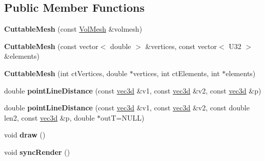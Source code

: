 \subsection*{Public Member Functions}
\begin{DoxyCompactItemize}
\item 
\hypertarget{classps_1_1elastic_1_1CuttableMesh_a1050ce8dfd09564ecd252c386d4c7743}{}{\bfseries Cuttable\+Mesh} (const \hyperlink{classps_1_1elastic_1_1VolMesh}{Vol\+Mesh} \&volmesh)\label{classps_1_1elastic_1_1CuttableMesh_a1050ce8dfd09564ecd252c386d4c7743}

\item 
\hypertarget{classps_1_1elastic_1_1CuttableMesh_a1245acf5e570ead2e0835594721d4adc}{}{\bfseries Cuttable\+Mesh} (const vector$<$ double $>$ \&vertices, const vector$<$ U32 $>$ \&elements)\label{classps_1_1elastic_1_1CuttableMesh_a1245acf5e570ead2e0835594721d4adc}

\item 
\hypertarget{classps_1_1elastic_1_1CuttableMesh_a8e01b70f0d11e393059dbda36645b755}{}{\bfseries Cuttable\+Mesh} (int ct\+Vertices, double $\ast$vertices, int ct\+Elements, int $\ast$elements)\label{classps_1_1elastic_1_1CuttableMesh_a8e01b70f0d11e393059dbda36645b755}

\item 
\hypertarget{classps_1_1elastic_1_1CuttableMesh_a933970175879dd15ac7e245e2c60a828}{}double {\bfseries point\+Line\+Distance} (const \hyperlink{classps_1_1base_1_1Vec3}{vec3d} \&v1, const \hyperlink{classps_1_1base_1_1Vec3}{vec3d} \&v2, const \hyperlink{classps_1_1base_1_1Vec3}{vec3d} \&p)\label{classps_1_1elastic_1_1CuttableMesh_a933970175879dd15ac7e245e2c60a828}

\item 
\hypertarget{classps_1_1elastic_1_1CuttableMesh_a22537bb36d06e7c7a57b56c8f2ec6177}{}double {\bfseries point\+Line\+Distance} (const \hyperlink{classps_1_1base_1_1Vec3}{vec3d} \&v1, const \hyperlink{classps_1_1base_1_1Vec3}{vec3d} \&v2, const double len2, const \hyperlink{classps_1_1base_1_1Vec3}{vec3d} \&p, double $\ast$out\+T=N\+U\+L\+L)\label{classps_1_1elastic_1_1CuttableMesh_a22537bb36d06e7c7a57b56c8f2ec6177}

\item 
\hypertarget{classps_1_1elastic_1_1CuttableMesh_a4d82322a19f083f4fa253eb77e06a9b9}{}void {\bfseries draw} ()\label{classps_1_1elastic_1_1CuttableMesh_a4d82322a19f083f4fa253eb77e06a9b9}

\item 
\hypertarget{classps_1_1elastic_1_1CuttableMesh_aa51f70d1383624cf84a6c18b62a29259}{}void {\bfseries sync\+Render} ()\label{classps_1_1elastic_1_1CuttableMesh_aa51f70d1383624cf84a6c18b62a29259}


\end{DoxyCompactItemize}
